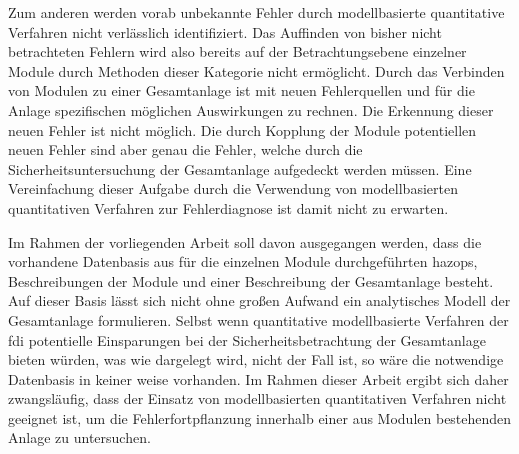 Zum anderen werden vorab unbekannte Fehler durch modellbasierte quantitative Verfahren nicht verl\"asslich identifiziert. Das Auffinden von bisher nicht betrachteten Fehlern wird also bereits auf der Betrachtungsebene einzelner Module durch Methoden dieser Kategorie nicht erm\"oglicht. Durch das Verbinden von Modulen zu einer Gesamtanlage ist mit neuen Fehlerquellen und f\"ur die Anlage spezifischen m\"oglichen Auswirkungen zu rechnen. Die Erkennung dieser neuen Fehler ist nicht m\"oglich. Die durch Kopplung der Module potentiellen neuen Fehler sind aber genau die Fehler, welche durch die Sicherheitsuntersuchung der Gesamtanlage aufgedeckt werden m\"ussen. Eine Vereinfachung dieser Aufgabe durch die Verwendung von modellbasierten quantitativen Verfahren zur Fehlerdiagnose ist damit nicht zu erwarten.

Im Rahmen der vorliegenden Arbeit soll davon ausgegangen werden, dass die vorhandene Datenbasis aus f\"ur die einzelnen Module durchgef\"uhrten \acp{hazop}, Beschreibungen der Module und einer Beschreibung der Gesamtanlage besteht. Auf dieser Basis l\"asst sich nicht ohne gro\ss{}en Aufwand ein analytisches Modell der Gesamtanlage formulieren. Selbst wenn quantitative modellbasierte Verfahren der \ac{fdi} potentielle Einsparungen bei der Sicherheitsbetrachtung der Gesamtanlage bieten w\"urden, was wie dargelegt wird, nicht der Fall ist, so w\"are die notwendige Datenbasis in keiner weise vorhanden. Im Rahmen dieser Arbeit ergibt sich daher  zwangsl\"aufig, dass der Einsatz von modellbasierten quantitativen Verfahren nicht geeignet ist, um die Fehlerfortpflanzung innerhalb einer aus Modulen bestehenden Anlage zu untersuchen.
 
